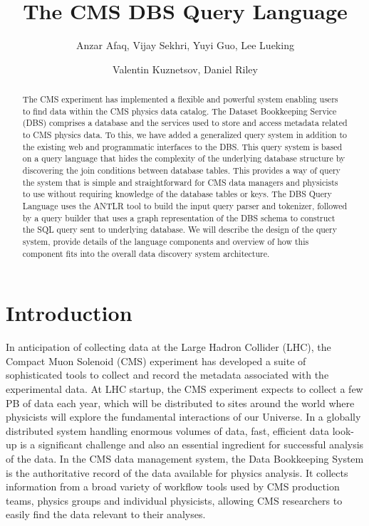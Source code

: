 \documentclass[a4paper]{jpconf}
\begin{document}
\title{The CMS DBS Query Language}

\author{Anzar Afaq, Vijay Sekhri, Yuyi Guo, Lee Lueking}
\address{Fermilab, Batavia, Illinois, USA}

\author{Valentin Kuznetsov, Daniel Riley}
\address{Cornell University, Ithaca, New York, USA}

\begin{abstract}
The CMS experiment has implemented a flexible and 
powerful system enabling users to find data within 
the CMS physics data catalog. The Dataset Bookkeeping 
Service (DBS) comprises a database and the services 
used to store and access metadata related to CMS physics 
data.  To this, we have added a generalized query system
in addition to the existing web and programmatic interfaces to the DBS.
This query system is based on a query language that hides the 
complexity of the underlying database structure by discovering the join conditions between
database tables. This provides 
a way of query the system that is simple and straightforward for 
CMS data managers and physicists to use without requiring knowledge of the database
tables or keys. The DBS Query Language 
uses the ANTLR tool to build the input query parser and tokenizer, 
followed by a query builder that uses a graph representation of the 
DBS schema to construct the SQL query sent to underlying database. 
We will describe the design of the query system, provide 
details of the language components
and overview of how this component fits into the overall data 
discovery system architecture.
\end{abstract}

\section{Introduction}

In anticipation of collecting data at the Large Hadron Collider (LHC),
the Compact Muon Solenoid (CMS) experiment has
developed a suite of sophisticated tools
to collect and record the metadata associated with the experimental data. At
LHC startup, the CMS experiment expects to collect a few
PB of data each year, which will be distributed to sites
around the world where physicists will explore the fundamental
interactions of our Universe. In a globally distributed system handling enormous volumes of data,
fast, efficient data look-up is a significant
challenge and also an essential ingredient for successful
analysis of the data. In the CMS data management system, the Data Bookkeeping
System\cite{DBS} is the authoritative record of
the data available for physics analysis. It collects
information from a broad variety of workflow tools used by CMS production teams, physics groups and individual physicists, allowing
CMS researchers to easily find the data relevant to their analyses.
\end{document}
